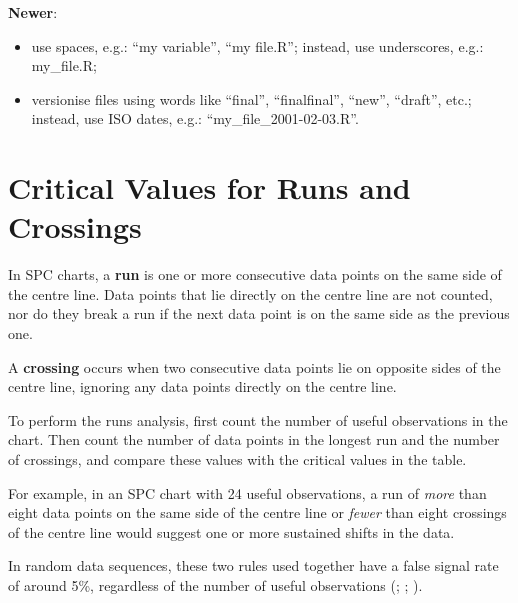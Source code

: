 \documentclass[
]{book}
\begin{document}
\textbf{Newer}:

\begin{itemize}
\item
  use spaces, e.g.: ``my variable'', ``my file.R''; instead, use underscores, e.g.: my\_file.R;
\item
  versionise files using words like ``final'', ``finalfinal'', ``new'', ``draft'', etc.; instead, use ISO dates, e.g.: ``my\_file\_2001-02-03.R''.
\end{itemize}

\chapter{Critical Values for Runs and Crossings}\label{runs-limits}

In SPC charts, a \textbf{run} is one or more consecutive data points on the same side of the centre line. Data points that lie directly on the centre line are not counted, nor do they break a run if the next data point is on the same side as the previous one.

A \textbf{crossing} occurs when two consecutive data points lie on opposite sides of the centre line, ignoring any data points directly on the centre line.

To perform the runs analysis, first count the number of useful observations in the chart. Then count the number of data points in the longest run and the number of crossings, and compare these values with the critical values in the table.

For example, in an SPC chart with 24 useful observations, a run of \emph{more} than eight data points on the same side of the centre line or \emph{fewer} than eight crossings of the centre line would suggest one or more sustained shifts in the data.

In random data sequences, these two rules used together have a false signal rate of around 5\%, regardless of the number of useful observations (; ; ).
\end{document}

